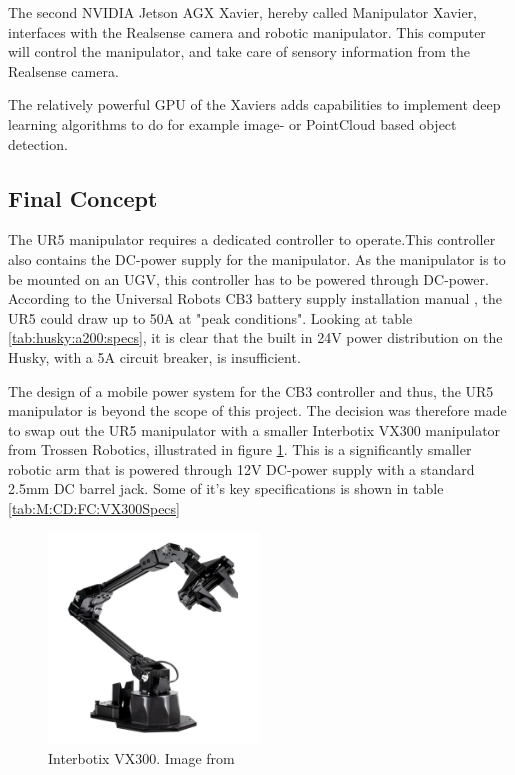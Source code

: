 The second NVIDIA Jetson AGX Xavier, hereby called Manipulator Xavier, interfaces with the Realsense camera and robotic manipulator. This computer will control the manipulator, and take care of sensory information from the Realsense camera. 

The relatively powerful GPU of the Xaviers adds capabilities to implement deep learning algorithms to do for example image- or PointCloud based object detection.

\subsection{Final Concept}\label{sec:M:CD:FinalConcept}

The UR5 manipulator requires a dedicated controller to operate.This controller also contains the DC-power supply for the manipulator. As the manipulator is to be mounted on an UGV, this controller has to be powered through DC-power. According to the Universal Robots CB3 battery supply installation manual \cite{ur5_battery_manual}, the UR5 could draw up to 50A at "peak conditions". Looking at table \ref{tab:husky:a200:specs}, it is clear that the built in 24V power distribution on the Husky, with a 5A circuit breaker, is insufficient.

The design of a mobile power system for the CB3 controller and thus, the UR5 manipulator is beyond the scope of this project. The decision was therefore made to swap out the UR5 manipulator with a smaller Interbotix VX300 manipulator from Trossen Robotics, illustrated in figure \ref{fig:M:CD:FC:VX300}. This is a significantly smaller robotic arm that is powered through 12V DC-power supply with a standard 2.5mm DC barrel jack. Some of it's key specifications is shown in table \ref{tab:M:CD:FC:VX300Specs}

\begin{figure}[H]
    \centering
    \includegraphics[width = 0.5\textwidth]{Figures/VX300.jpg}
    \caption{Interbotix VX300. Image from \cite{interbotix_vx300}}
    \label{fig:M:CD:FC:VX300}
\end{figure}

